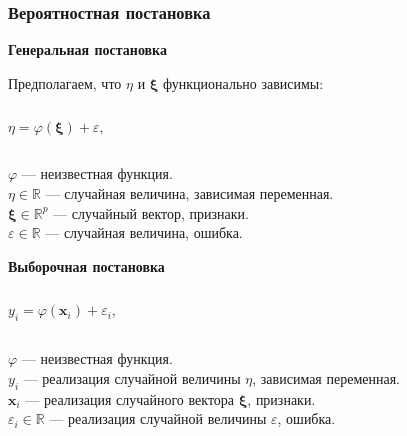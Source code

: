 \documentclass[pdf, 9pt, usenames, dvipsnames, unicode, hyperref={bookmarks=true,bookmarksopen=false, bookmarksnumbered}]{beamer}
\begin{document}
\begin{frame}\frametitle{Вероятностная постановка}

\begin{center}
    \textbf{Генеральная постановка}
\end{center}

Предполагаем, что $\eta$ и $\bm{\xi}$ функционально зависимы:

\begin{columns}

    \column{4.9 in}
    \begin{tcolorbox}[width=4.8in,left=0mm,right=0mm,top=0mm,bottom=0mm,boxrule=0pt]

    $$\eta = \varphi(\bm{\xi}) + \varepsilon,$$
    
\end{tcolorbox}
\end{columns}

$\varphi$ --- неизвестная функция.\\
$\eta \in \mathbb{R}$ --- случайная величина, зависимая переменная.\\
$\bm{\xi} \in \mathbb{R}^p$ --- случайный вектор, признаки.\\
$\varepsilon \in \mathbb{R}$ --- случайная величина, ошибка.\\

\begin{center}
    \textbf{Выборочная постановка}
\end{center}


\begin{columns}

    \column{4.9 in}
    \begin{tcolorbox}[width=4.8in,left=0mm,right=0mm,top=0mm,bottom=0mm,boxrule=0pt]

    $$y_i = \varphi(\textbf{x}_i) + \varepsilon_i,$$

\end{tcolorbox}
\end{columns}

\noindent$\varphi$ --- неизвестная функция.\\
$y_i$ --- реализация случайной величины $\eta$, зависимая переменная.\\
$\textbf{x}_i$ --- реализация случайного вектора $\bm{\xi}$, признаки.\\
$\varepsilon_i \in \mathbb{R}$ --- реализация случайной величины $\varepsilon$, ошибка.\\

\end{frame}
\end{document}
